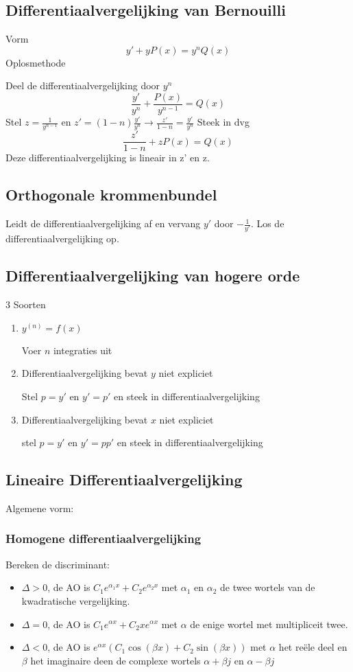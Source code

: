 \documentclass{report}
\begin{document}
\subsection*{Differentiaalvergelijking van Bernouilli}
Vorm
$$y' + yP(x) = y^nQ(x)$$
Oplosmethode

Deel de differentiaalvergelijking door $y^n$
$$\frac{y'}{y^n} + \frac{P(x)}{y^{n - 1}} = Q(x)$$
Stel $z = \frac{1}{y^{n - 1}}$ en $z' = (1 - n)\frac{y'}{y^n} \rightarrow \frac{z'}{1 - n} = \frac{y'}{y^n}$
Steek in dvg
$$\frac{z'}{1 - n} + zP(x) = Q(x)$$
Deze differentiaalvergelijking is lineair in z' en z.

\subsection*{Orthogonale krommenbundel}
Leidt de differentiaalvergelijking af en vervang $y'$ door $-\frac{1}{y'}$. Los de differentiaalvergelijking op.

\subsection*{Differentiaalvergelijking van hogere orde}
3 Soorten
\begin{enumerate}

 \item $y^{(n)} = f(x)$
 
        Voer $n$ integraties uit
 \item Differentiaalvergelijking bevat $y$ niet expliciet
 
        Stel $p = y'$ en $y' = p'$ en steek in differentiaalvergelijking
        
 \item Differentiaalvergelijking bevat $x$ niet expliciet
        
        stel $p = y'$ en $y' = pp'$ en steek in differentiaalvergelijking
\end{enumerate}

\subsection*{Lineaire Differentiaalvergelijking}
Algemene vorm:

\subsubsection*{Homogene differentiaalvergelijking}
Bereken de discriminant:
\begin{itemize}
 \item $\Delta > 0$, de AO is $C_1e^{\alpha_1 x} +C_2e^{\alpha_2 x}$ met $\alpha_1$ en $\alpha_2$ de twee wortels van de kwadratische vergelijking.
 \item $\Delta = 0$, de AO is $C_1e^{\alpha x} + C_2xe^{\alpha x}$ met $\alpha$ de enige wortel met multipliceit twee.
 \item $\Delta < 0$, de AO is $e^{\alpha x}(C_1\cos(\beta x) + C_2\sin(\beta x))$ met $\alpha$ het reële deel en $\beta$ het imaginaire deen de complexe wortels $\alpha + \beta j$ en $\alpha - \beta j$
\end{itemize}
\end{document}

